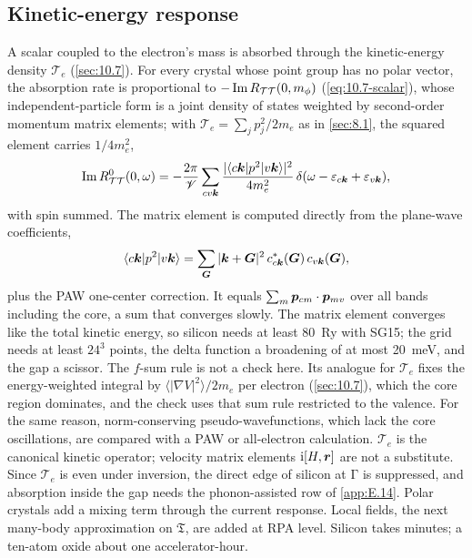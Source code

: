 \subsection{Kinetic-energy response}

A scalar coupled to the electron's mass is absorbed through the kinetic-energy density $\mathcal{T}_e$ (\cref{sec:10.7}). For every crystal whose point group has no polar vector, the absorption rate is proportional to $-\operatorname{Im} R_{\mathcal{T}\mathcal{T}}(0,m_\phi)$ (\cref{eq:10.7-scalar}), whose independent-particle form is a joint density of states weighted by second-order momentum matrix elements; with $\mathcal{T}_e = \sum_jp_j^2/2m_e$ as in \cref{sec:8.1}, the squared element carries $1/4m_e^2$,
\begin{equation}
  \operatorname{Im} R^0_{\mathcal{T}\mathcal{T}}(0,\omega) = -\frac{2\pi}{\mathscr{V}}\sum_{cv\bm{k}}\frac{|\langle c\bm{k}|p^2|v\bm{k}\rangle|^2}{4m_e^2}\,\delta(\omega - \varepsilon_{c\bm{k}} + \varepsilon_{v\bm{k}}) ,
  \label{eq:E.16-TT}
\end{equation}
with spin summed. The matrix element is computed directly from the plane-wave coefficients,
\begin{equation*}
  \langle c\bm{k}|p^2|v\bm{k}\rangle = \sum_{\bm{G}}|\bm{k}+\bm{G}|^2\,c^*_{c\bm{k}}(\bm{G})\,c_{v\bm{k}}(\bm{G}) ,
\end{equation*}
plus the PAW one-center correction. It equals $\sum_m\bm{p}_{cm}\cdot\bm{p}_{mv}$ over all bands including the core, a sum that converges slowly. The matrix element converges like the total kinetic energy, so silicon needs at least \SI{80}{Ry} with SG15; the grid needs at least $24^3$ points, the delta function a broadening of at most \SI{20}{meV}, and the gap a scissor. The $f$-sum rule is not a check here. Its analogue for $\mathcal{T}_e$ fixes the energy-weighted integral by $\langle|\nabla V|^2\rangle/2m_e$ per electron (\cref{sec:10.7}), which the core region dominates, and the check uses that sum rule restricted to the valence. For the same reason, norm-conserving pseudo-wavefunctions, which lack the core oscillations, are compared with a PAW or all-electron calculation. $\mathcal{T}_e$ is the canonical kinetic operator; velocity matrix elements $\mathrm{i}[H,\bm{r}]$ are not a substitute. Since $\mathcal{T}_e$ is even under inversion, the direct edge of silicon at $\mathrm{\Gamma}$ is suppressed, and absorption inside the gap needs the phonon-assisted row of \cref{app:E.14}. Polar crystals add a mixing term through the current response. Local fields, the next many-body approximation on $\mathfrak{T}$, are added at RPA level. Silicon takes minutes; a ten-atom oxide about one accelerator-hour.

